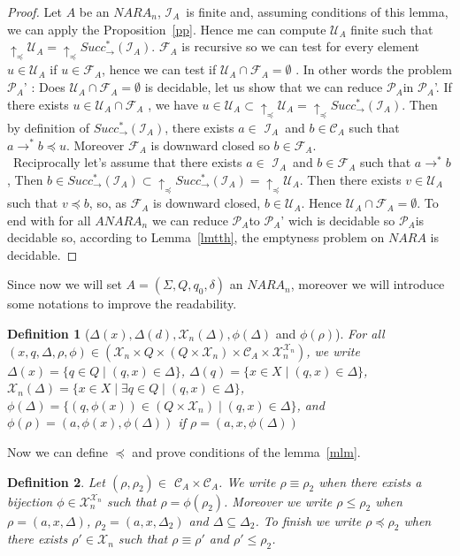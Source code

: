 \documentclass[a4paper,10pt]{report}
\newtheorem{df}{Definition}
\newcommand{\C}{\mathcal{C}_{A}}
\newcommand{\I}{\mathcal{I}_{A}}
\newcommand{\F}{\mathcal{F}_{A}}
\newcommand{\U}{\mathcal{U}_{A}}
\newcommand{\X}{\mathcal{X}_{n}}
\newcommand{\pb}{$\mathcal{P}_{A}$}
\begin{document}
\begin{proof}
  Let $A$ be an $NARA_n$,
  $\I$\ is finite and, assuming conditions of this lemma, we can apply the Proposition~\ref{pp}.
  Hence me can compute $\U$ finite such that $\uparrow_\preceq \U=\uparrow_\preceq Succ^*_\rightarrow (\I)$.
  $\F$ is recursive so we can test for every element $u \in \U$ if $u \in\F$, hence we can test if $\U \cap\F=\emptyset$ . 
  In other words the problem \pb' : Does $\U \cap \F =\emptyset$ is decidable, let us show that we can reduce \pb in \pb'.  
  If there exists $u \in \U \cap \F$ , we have $u\in \U \subset \uparrow_\preceq  \U =\uparrow_\preceq Succ^*_\rightarrow (\I)$. 
  Then by definition of $Succ^*_\rightarrow (\I)$, there exists $a\in$ $\I$\ and $b \in\C$ such that $a \rightarrow^* b \preceq u$.
  Moreover $\F$ is downward closed so $b \in \F$.\\\
  Reciprocally let's assume that there exists $a\in$ $\I$\ and $b \in\F$ such that $a \rightarrow^* b $,
  Then $b \in  Succ^*_\rightarrow (\I) \subset \uparrow_\preceq Succ^*_\rightarrow (\I)=\uparrow_\preceq  \U$. 
  Then there exists $v \in \U$ such that $v \preceq b$, so, as $\F$ is downward closed, $b \in \U$. Hence $\U \cap \F =\emptyset$.
  To end with for all $ANARA_n$ we can reduce \pb to \pb' wich is decidable so \pb is decidable so, according to Lemma~\ref{lmtth},  the emptyness problem on $NARA$ is decidable.
\end{proof}

Since now we will set $A =(\Sigma ,Q ,q_0, \delta )$ an $NARA_n$, moreover we will introduce some notations to improve the readability.

\begin{df}[$\Delta(x), \Delta(d),\X(\Delta), \phi(\Delta)$ and $ \phi(\rho)$]
For all $(x,q,\Delta,\rho,\phi) \in (\X \times Q \times (Q \times \X) \times \C \times \X^{\X})$, we write 
$\Delta(x) = \{ q\in Q \mid (q,x) \in \Delta \}$,
$\Delta(q) = \{ x\in X \mid (q,x) \in \Delta \}$,
$\X(\Delta) = \{ x\in X \mid \exists q\in Q \mid (q,x) \in \Delta \}$,
$\phi(\Delta) = \{ (q,\phi(x)) \in (Q \times \X) \mid (q,x) \in \Delta \}$,
and $\phi(\rho) = (a,\phi(x),\phi(\Delta))$ if $\rho = (a,x,\phi(\Delta))$
\end{df}

Now we can define $\preceq$ and prove conditions of the lemma~\ref{mlm}.

\begin{df}
  Let $(\rho,\rho_2) \in$  $\C\times\C$.
  We write $\rho \equiv \rho_2$ when there exists a bijection $\phi \in \X^{\X}$ such that  $ \rho=\phi(\rho_2)$.    
  Moreover we write $\rho \leq \rho_2$ when $ \rho=(a ,x, \Delta  )$, $\rho_2=(a ,x, \Delta_2  )$ and $\Delta \subseteq \Delta_2$.
  To finish we write $\rho \preceq \rho_2$ when there exists $\rho' \in \X$ such that $\rho \equiv \rho'$ and $\rho' \leq \rho_2$.
\end{df}
\end{document}

